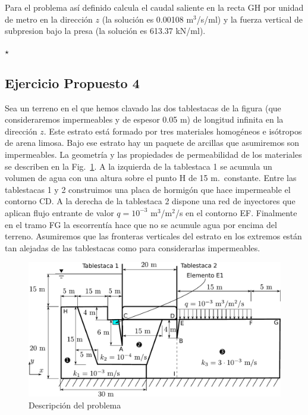 Para el problema así definido calcula el caudal saliente en la recta
GH por unidad de metro en la dirección $z$ (la solución es 0.00108
m$^3$/s/ml) y la fuerza vertical de subpresion bajo la presa (la
solución es 613.37 kN/ml).  \vspace{3mm}

\hspace{20mm}\hrulefill$\star$\hrulefill\hspace{20mm}

\clearpage \newpage
\subsection{Ejercicio Propuesto 4}

Sea un terreno en el que hemos clavado las dos tablestacas de la figura
(que consideraremos impermeables y de espesor 0.05 m) de longitud infinita
en la dirección $z$. Este estrato está formado por tres materiales homogéneos
e isótropos de arena limosa.
Bajo ese estrato hay un paquete de arcillas que asumiremos son
impermeables.  La geometría y las propiedades de permeabilidad de
los materiales se describen en la Fig.~\ref{enup04}.
A la izquierda de la tablestaca 1  se acumula un volumen de agua
con una altura sobre el punto H de 15 m.~constante. Entre las tablestacas 1 y 2
construimos una placa de hormigón que hace impermeable el contorno CD. A la derecha de la tablestaca 2 dispone una red de inyectores que aplican flujo entrante de valor $q=10^{-3}$ m$^3$/m$^2$/s en el contorno EF. Finalmente en el tramo FG la escorrentía hace que no se
acumule agua por encima del terreno. Asumiremos que las fronteras
verticales del estrato en los extremos están tan alejadas de las tablestacas
como para considerarlas impermeables.  \vspace{-2mm}
\begin{figure}[!h]
  \centering
  \includegraphics[width=1.0\linewidth]{./body/images/enup04}
  \caption{Descripción del problema}
  \label{enup04}
\end{figure}

